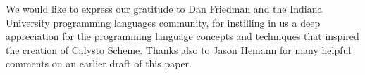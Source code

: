\documentclass[acmsmall,screen,anonymous,review]{acmart}
\begin{document}
\begin{acks}
We would like to express our gratitude to Dan Friedman and the Indiana
University programming languages community, for instilling in us a deep
appreciation for the programming language concepts and techniques that inspired
the creation of Calysto Scheme.  Thanks also to Jason Hemann for many helpful
comments on an earlier draft of this paper.
\end{acks}



\end{document}
